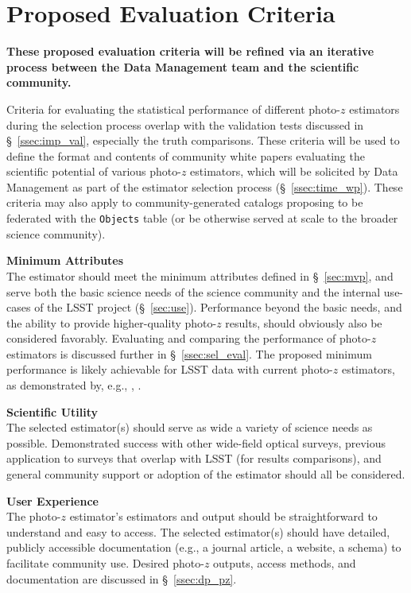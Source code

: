 \documentclass[DM,lsstdraft,toc]{lsstdoc}
\begin{document}
\section{Proposed Evaluation Criteria} \label{sec:sel}

\textbf{These proposed evaluation criteria will be refined via an iterative process between the Data Management team and the scientific community.}

Criteria for evaluating the statistical performance of different photo-$z$ estimators during the selection process overlap with the validation tests discussed in \S~\ref{ssec:imp_val}, especially the truth comparisons.
These criteria will be used to define the format and contents of community white papers evaluating the scientific potential of various photo-$z$ estimators, which will be solicited by Data Management as part of the estimator selection process (\S~\ref{ssec:time_wp}).
These criteria may also apply to community-generated catalogs proposing to be federated with the {\tt Objects} table (or be otherwise served at scale to the broader science community).

{\bf Minimum Attributes}\\
The estimator should meet the minimum attributes defined in \S~\ref{sec:mvp}, and serve both the basic science needs of the science community and the internal use-cases of the LSST project (\S~\ref{sec:use}).
Performance beyond the basic needs, and the ability to provide higher-quality photo-$z$ results, should obviously also be considered favorably.
Evaluating and comparing the performance of photo-$z$ estimators is discussed further in \S~\ref{ssec:sel_eval}.
The proposed minimum performance is likely achievable for LSST data with current photo-$z$ estimators, as demonstrated by, e.g., \citet{2018AJ....155....1G}, \citet{2020arXiv200103621S}.

{\bf Scientific Utility}\\
The selected estimator(s) should serve as wide a variety of science needs as possible.
Demonstrated success with other wide-field optical surveys, previous application to surveys that overlap with LSST (for results comparisons), and general community support or adoption of the estimator should all be considered.

{\bf User Experience}\\
The photo-$z$ estimator's estimators and output should be straightforward to understand and easy to access.
The selected estimator(s) should have detailed, publicly accessible documentation (e.g., a journal article, a website, a schema) to facilitate community use.
Desired photo-$z$ outputs, access methods, and documentation are discussed in \S~\ref{ssec:dp_pz}.
\end{document}
